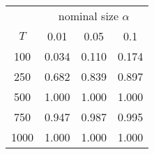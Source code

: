 % 
\begin{tabular}{cccc}
  \hline
  & \multicolumn{3}{c}{nominal size $\alpha$} \\
 $T$ & 0.01 & 0.05 & 0.1 \\
 \hline
100 & 0.034 & 0.110 & 0.174 \\ 
  250 & 0.682 & 0.839 & 0.897 \\ 
  500 & 1.000 & 1.000 & 1.000 \\ 
  750 & 0.947 & 0.987 & 0.995 \\ 
  1000 & 1.000 & 1.000 & 1.000 \\ 
   \hline
\end{tabular}
